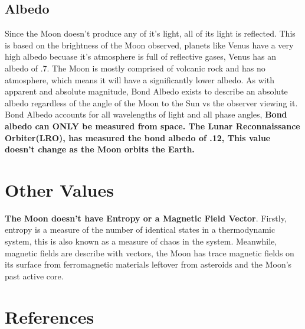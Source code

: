 \documentclass[12pt,oneside,a4paper,english]{article}
\begin{document}
\subsection{Albedo}
Since the Moon doesn't produce any of it's light, all of its light is reflected. This is based on the brightness of the Moon observed, planets like Venus have a very high albedo becuase it's atmosphere is full of reflective gases, Venus has an albedo of .7. The Moon is mostly comprised of volcanic rock and has no atmosphere, which means it will have a significantly lower albedo. As with apparent and absolute magnitude, Bond Albedo exists to describe an absolute albedo regardless of the angle of the Moon to the Sun vs the observer viewing it. Bond Albedo accounts for all wavelengths of light and all phase angles, \textbf{Bond albedo can ONLY be measured from space. The Lunar Reconnaissance Orbiter(LRO), has measured the bond albedo of .12, This value doesn't change as the Moon orbits the Earth.}

\section{Other Values}
\textbf{The Moon doesn't have Entropy or a Magnetic Field Vector}. Firstly, entropy is a measure of the number of identical states in a thermodynamic system, this is also known as a measure of chaos in the system. Meanwhile, magnetic fields are describe with vectors, the Moon has trace magnetic fields on its surface from ferromagnetic materials leftover from asteroids and the Moon's past active core. 
\newpage
\section{References}


\end{document}
